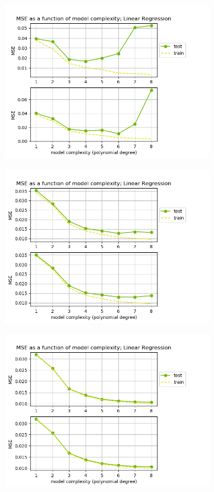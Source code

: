 \begin{figure}[!htbp]
\begin{subfigure}{\textwidth}
  \centering
  \includegraphics[width=0.55\linewidth]{images/mse/fake_linear_mse_p08_n10.png}
\end{subfigure}
\begin{subfigure}{\textwidth}
  \centering
  \includegraphics[width=0.55\linewidth]{images/mse/fake_linear_mse_p08_n21.png}
\end{subfigure}
\begin{subfigure}{\textwidth}
  \centering
  \includegraphics[width=0.55\linewidth]{images/mse/fake_linear_mse_p08_n50.png}

\end{subfigure}
\end{figure}
